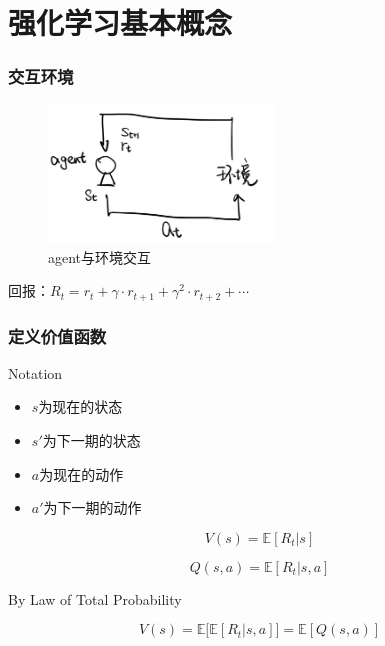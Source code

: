 \documentclass[9pt]{beamer}
\begin{document}

\section{强化学习基本概念}
\begin{frame}
\frametitle{交互环境}

\begin{figure}
\includegraphics[width=6cm]{../fig/agent.jpg}
\caption{agent与环境交互}
\end{figure}

回报：$R_t=r_t+\gamma\cdot r_{t+1}+\gamma^2\cdot r_{t+2}+\cdots$

\end{frame}


\begin{frame}
\frametitle{定义价值函数}

Notation

\begin{itemize}
\item $s$为现在的状态
\item $s'$为下一期的状态
\item $a$为现在的动作
\item $a'$为下一期的动作
\end{itemize}

\vspace{1em}

\[
V(s)=\mathbb{E}[R_t|s]
\]

\[
Q(s,a)=\mathbb{E}[R_t|s,a]
\]

By Law of Total Probability

\[
V(s)=\mathbb{E}\bigg[\mathbb{E}[R_t|s,a]\bigg]=\mathbb{E}[Q(s,a)]
\]

\end{frame}
\end{document}
